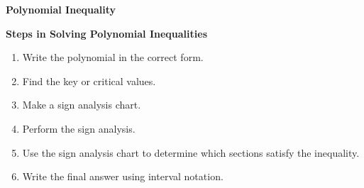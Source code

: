 \begin{center}
\textbf{Polynomial Inequality}
\end{center}

\vspace*{1ex}

\textbf{Steps in Solving Polynomial Inequalities}
\begin{enumerate}[label = \arabic*. ]
\item \hspce Write the polynomial in the correct form. 
\item \hspce Find the key or critical values. 
\item \hspce Make a sign analysis chart. 
\item \hspce Perform the sign analysis. 
\item \hspce Use the sign analysis chart to determine which sections satisfy the inequality. 
\item \hspce Write the final answer using interval notation. 
\end{enumerate} 
